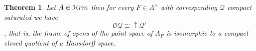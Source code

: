 \documentclass[11pt]{amsart}
\DeclareMathOperator{\pt}{pt}
\theoremstyle{plain}
\newtheorem{thm}{Theorem}[section]
\newtheorem{cor}[thm]{Corollary}
\newtheorem{prop}[thm]{Proposition}
\theoremstyle{definition}
\begin{document}









\begin{thm}\label{haus1}
Let $A\in\EuScript{H}rm$ then for every $F\in A^{\wedge}$ with corresponding $\mathcal{Q}$ compact saturated we have \[\mathcal{O}\mathcal{Q}\cong\uparrow\mathcal{Q}'\], that is,
the frame of opens of the point space of $A_{F}$ is isomorphic to a compact closed quotient of a Hausdorff space.
\end{thm}
\end{document}
